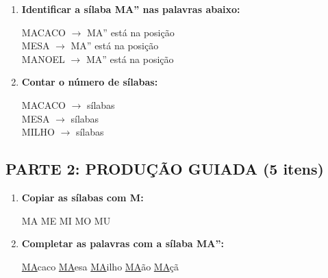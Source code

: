 \begin{exercicio}
\begin{enumerate}
  \item \textbf{Identificar a sílaba MA'' nas palavras abaixo:}
  \begin{center}
  MACACO $\rightarrow$ MA'' está na posição \underline{\hspace{1cm}} \\
  MESA $\rightarrow$ MA'' está na posição \underline{\hspace{1cm}} \\
  MANOEL $\rightarrow$ MA'' está na posição \underline{\hspace{1cm}}
  \end{center}

  \item \textbf{Contar o número de sílabas:}
  \begin{center}
  MACACO $\rightarrow$ \underline{\hspace{1cm}} sílabas \\
  MESA $\rightarrow$ \underline{\hspace{1cm}} sílabas \\
  MILHO $\rightarrow$ \underline{\hspace{1cm}} sílabas
  \end{center}
\end{enumerate}

\subsection*{PARTE 2: PRODUÇÃO GUIADA (5 itens)}

\begin{enumerate}[resume]
  \item \textbf{Copiar as sílabas com M:}
  \begin{center}
  MA \quad \underline{\hspace{1.5cm}} \quad ME \quad \underline{\hspace{1.5cm}} \quad MI \quad \underline{\hspace{1.5cm}} \quad MO \quad \underline{\hspace{1.5cm}} \quad MU \quad \underline{\hspace{1.5cm}}
  \end{center}

  \item \textbf{Completar as palavras com a sílaba MA'':}
  \begin{center}
  \underline{MA}caco \quad \underline{MA}esa \quad \underline{MA}ilho \quad \underline{MA}ão \quad \underline{MA}çã
  \end{center}


\end{enumerate}
\end{exercicio}
